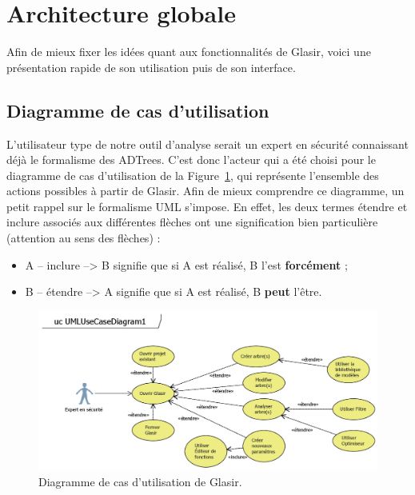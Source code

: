 \section{Architecture globale}
    \label{sec:archiGlobale}
    
    Afin de mieux fixer les idées quant aux fonctionnalités de Glasir, voici une présentation rapide de son utilisation puis de son interface.
	    
    \subsection{Diagramme de cas d'utilisation}
    \label{sec:casutil}
    
    L'utilisateur type de notre outil d'analyse serait un expert en sécurité connaissant déjà le formalisme des ADTrees. C'est donc l'acteur qui a été choisi pour le diagramme de cas d'utilisation de la {\sc Figure}~\ref{fig:use_case}, qui représente l'ensemble des actions possibles à partir de Glasir. Afin de mieux comprendre ce diagramme, un petit rappel sur le formalisme UML s'impose. En effet, les deux termes \og étendre \fg{} et \og inclure \fg{} associés aux différentes flèches ont une signification bien particulière (attention au sens des flèches) :

    \begin{itemize}
    \item A -- \og inclure \fg{} --> B signifie que si A est réalisé, B l'est {\bf forcément} ;
    \item B -- \og étendre \fg{} --> A signifie que si A est réalisé, B {\bf peut} l'être.
    \end{itemize}

    \begin{figure}[H]
        \centering
        \includegraphics[height=0.5\textwidth]{figure/UseCaseDiagram.png}
        \caption{Diagramme de cas d'utilisation de Glasir.}
        \label{fig:use_case}
    \end{figure}

